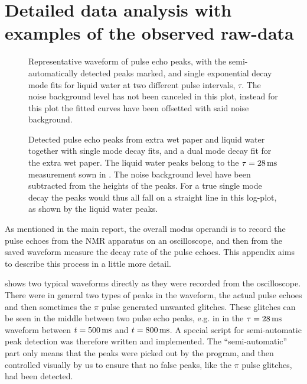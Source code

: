 \documentclass[11pt,a4paper, twocolumn,
swedish, english %
]{article}
\begin{document}
\clearpage


\clearpage %
\appendix  %

\section{Detailed data analysis 
with examples of the observed raw-data}
\label{apx:data-analysis}

\begin{figure*}
\centering

\caption{Representative waveform of pulse echo peaks, with the
  semi-automatically detected peaks marked, and single exponential
  decay mode fits for liquid water at two different pulse intervals,
  $\tau$. The noise background level has not been canceled in this
  plot, instead for this plot the fitted curves have been offsetted
  with said noise background. } 
\label{fig:waveform}
\end{figure*}

\begin{figure*}
\centering

\caption{Detected pulse echo peaks from extra wet paper and liquid
  water together with single mode decay fits, and a dual mode decay
  fit for the extra wet paper. The liquid water peaks belong to the
  $\tau=\unit[28]{ms}$ measurement sown in .
  The noise background level have been subtracted from the heights of
  the peaks. For a true single mode decay the peaks would thus all
  fall on a straight line in this log-plot, as shown by the liquid
  water peaks. } 
\label{fig:fitted-peaks}
\end{figure*}

As mentioned in the main report, the overall modus operandi is to
record the pulse echoes from the NMR apparatus on an oscilloscope, and
then from the saved waveform measure the decay rate of the pulse
echoes. This appendix aims to describe this process in a little more
detail. 

 shows two typical waveforms directly as they
were recorded from the oscilloscope. There were in general two
types of peaks in the waveform, the actual pulse echoes and then
sometimes the $\pi$ pulse generated unwanted glitches. These glitches
can be seen in the middle between two pulse echo peaks, e.g. in
 in the $\tau=\unit[28]{ms}$ waveform between
$t=\unit[500]{ms}$ and $t=\unit[800]{ms}$. A special script for
semi-automatic peak detection was therefore written and implemented. 
The ``semi-automatic'' part only means that the peaks were picked out
by the program, and then controlled visually by us to ensure that no
false peaks, like the $\pi$ pulse glitches, had been detected. 
\end{document}
